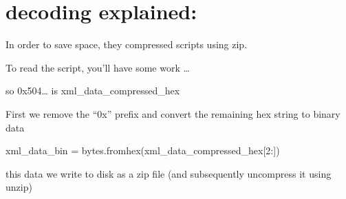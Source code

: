 \documentclass[letterpaper,10pt,english]{sphinxmanual}
\begin{document}
\chapter{decoding explained:}
\label{\detokenize{decoding:decoding-explained}}\label{\detokenize{decoding::doc}}
\sphinxAtStartPar
In order to save space, they compressed scripts using zip.

\sphinxAtStartPar
To read the script, you’ll have some work …

\sphinxAtStartPar
so 0x504… is  xml\_data\_compressed\_hex

\sphinxAtStartPar
First we remove the “0x” prefix and convert the remaining hex string to binary data

\sphinxAtStartPar
xml\_data\_bin = bytes.fromhex(xml\_data\_compressed\_hex{[}2:{]})

\sphinxAtStartPar
this data we write to disk as a zip file (and subsequently uncompress it using unzip)
\end{document}
